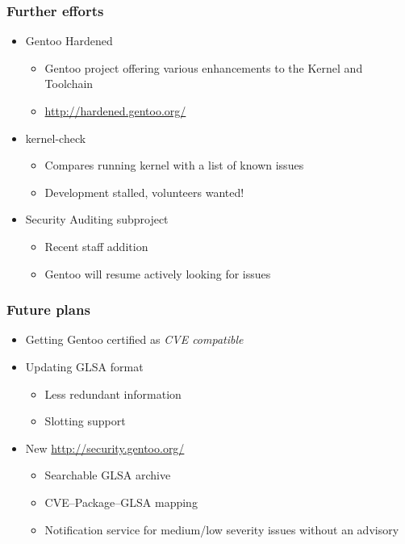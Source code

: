 \documentclass[svgnames]{beamer}
\begin{document}
\begin{frame}
  \frametitle{Further efforts}
    \begin{itemize}\addtolength{\itemsep}{0.5\baselineskip}
     \item Gentoo Hardened
     \begin{itemize}
      \item Gentoo project offering various enhancements to the Kernel and Toolchain
      \item \url{http://hardened.gentoo.org/}
     \end{itemize}
     
     \item kernel-check
     \begin{itemize}
      \item Compares running kernel with a list of known issues
      \item Development stalled, volunteers wanted!
     \end{itemize}

     
     \item Security Auditing subproject
     \begin{itemize}
      \item Recent staff addition
      \item Gentoo will resume actively looking for issues
     \end{itemize}

    \end{itemize}
\end{frame}

\begin{frame}
  \frametitle{Future plans}
  
  \begin{itemize}\addtolength{\itemsep}{0.5\baselineskip}
    \item Getting Gentoo certified as \textit{CVE compatible}
    \item Updating GLSA format
      \begin{itemize}
        \item Less redundant information
        \item Slotting support
      \end{itemize}
    \item New \url{http://security.gentoo.org/}
    \begin{itemize}
      \item Searchable GLSA archive
      \item CVE–Package–GLSA mapping
      \item Notification service for medium/low severity issues without an advisory
    \end{itemize}
  \end{itemize}

\end{frame}
\end{document}
